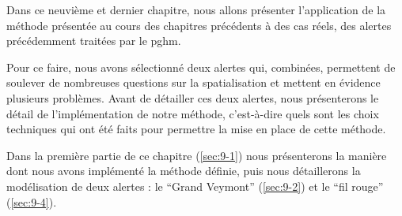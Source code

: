 Dans ce neuvième et dernier chapitre, nous allons présenter
l'application de la méthode présentée au cours des chapitres
précédents à des cas réels, des alertes précédemment traitées par le
\ac{pghm}.

Pour ce faire, nous avons sélectionné deux alertes qui, combinées,
permettent de soulever de nombreuses questions sur la spatialisation
et mettent en évidence plusieurs problèmes. Avant de détailler ces
deux alertes, nous présenterons le détail de l'implémentation de notre
méthode, c'est-à-dire quels sont les choix techniques qui ont été
faits pour permettre la mise en place de cette méthode.

Dans la première partie de ce chapitre (\autoref{sec:9-1}) nous
présenterons la manière dont nous avons implémenté la méthode définie,
puis nous détaillerons la modélisation de deux alertes : le
\enquote{Grand Veymont} (\autoref{sec:9-2}) et le \enquote{fil rouge}
(\autoref{sec:9-4}).

